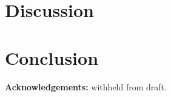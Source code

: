 \documentclass[11pt, executivepaper]{article}
\begin{document}
\section{Discussion}
\label{Discussion}
%
%
%
%
%
%
%
%
%
%

\section{Conclusion}
\label{conc}
\vspace{5mm}

\textbf{Acknowledgements:} withheld from draft.
\clearpage



\end{document}
